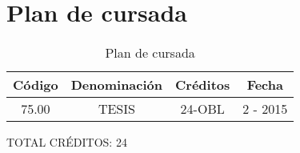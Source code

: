 
\chapter{Plan de cursada} %

\label{AppendixC} %

\begin{table}[!htb]
    \centering
    \begin{tabular}{|c|c|c|c|}
        \hline
        Código & Denominación & Créditos & Fecha \\
        \hline
        75.00 & TESIS & 24-OBL & 2 - 2015 \\
        \hline
    \end{tabular}
    \caption{Plan de cursada} \label{tabPlanCursada}
\end{table}

TOTAL CRÉDITOS: 24	

